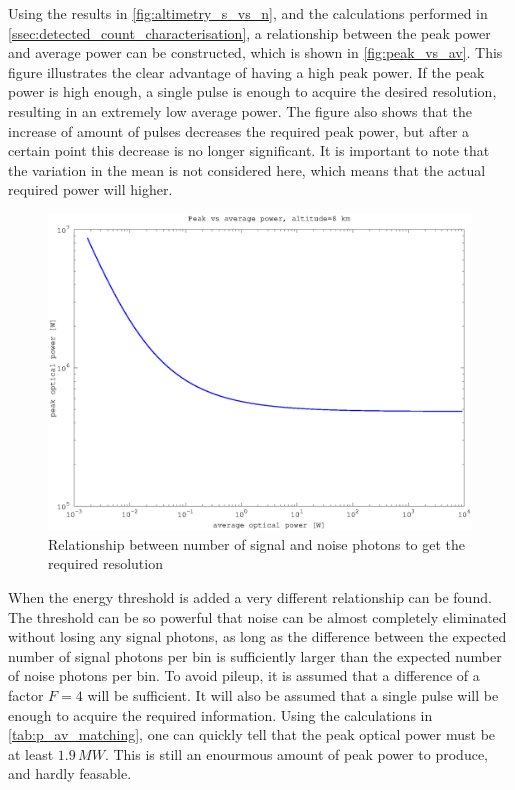 Using the results in \cref{fig:altimetry_s_vs_n}, and the calculations performed in \cref{ssec:detected_count_characterisation}, a relationship between the peak power and average power can be constructed, which is shown in \cref{fig:peak_vs_av}. This figure illustrates the clear advantage of having a high peak power. If the peak power is high enough, a single pulse is enough to acquire the desired resolution, resulting in an extremely low average power. The figure also shows that the increase of amount of pulses decreases the required peak power, but after a certain point this decrease is no longer significant. It is important to note that the variation in the mean is not considered here, which means that the actual required power will higher.

\begin{figure}[h]
\centering
	\includegraphics[width=0.8\linewidth]{fig/peak_vs_av.eps}
\caption{Relationship between number of signal and noise photons to get the required resolution}
\label{fig:temp_label}
\end{figure}


When the energy threshold is added a very different relationship can be found. The threshold can be so powerful that noise can be almost completely eliminated without losing any signal photons, as long as the difference between the expected number of signal photons per bin is sufficiently larger than the expected number of noise photons per bin. To avoid pileup, it is assumed that a difference of a factor $F=4$ will be sufficient. It will also be assumed that a single pulse will be enough to acquire the required information. Using the calculations in \cref{tab:p_av_matching}, one can quickly tell that the peak optical power must be at least $1.9\,MW$. This is still an enourmous amount of peak power to produce, and hardly feasable.

